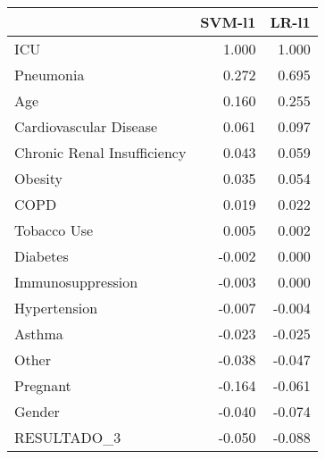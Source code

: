 \begin{tabular}{lrr}
\toprule
{} &  SVM-l1 &  LR-l1 \\
\midrule
ICU                         &   1.000 &  1.000 \\
Pneumonia                   &   0.272 &  0.695 \\
Age                         &   0.160 &  0.255 \\
Cardiovascular Disease      &   0.061 &  0.097 \\
Chronic Renal Insufficiency &   0.043 &  0.059 \\
Obesity                     &   0.035 &  0.054 \\
COPD                        &   0.019 &  0.022 \\
Tobacco Use                 &   0.005 &  0.002 \\
Diabetes                    &  -0.002 &  0.000 \\
Immunosuppression           &  -0.003 &  0.000 \\
Hypertension                &  -0.007 & -0.004 \\
Asthma                      &  -0.023 & -0.025 \\
Other                       &  -0.038 & -0.047 \\
Pregnant                    &  -0.164 & -0.061 \\
Gender                      &  -0.040 & -0.074 \\
RESULTADO\_3                 &  -0.050 & -0.088 \\
\bottomrule
\end{tabular}
